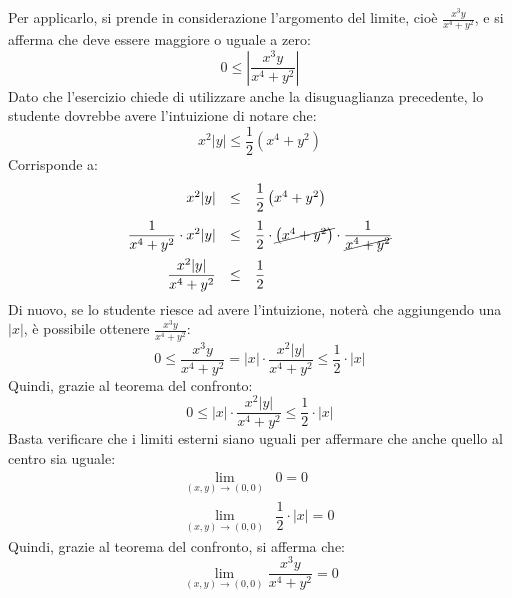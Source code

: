 \documentclass[a4paper]{article}
\begin{document}
	\noindent
	Per applicarlo, si prende in considerazione l'argomento del limite, cioè $\frac{x^{3}y}{x^{4}+y^{2}}$, e si afferma che deve essere maggiore o uguale a zero:
	\begin{equation*}
		0 \le \left| \dfrac{x^{3}y}{x^{4}+y^{2}} \right|
	\end{equation*}
	Dato che l'esercizio chiede di utilizzare anche la disuguaglianza precedente, lo studente dovrebbe avere l'intuizione di notare che:
	\begin{equation*}
		x^{2} |y| \le \dfrac{1}{2}\left(x^{4} + y^{2}\right)
	\end{equation*}
	Corrisponde a:
	\begin{equation*}
		\begin{array}{rcl}
			x^{2} |y| &\le& \dfrac{1}{2}\left(x^{4} + y^{2}\right) \\ [1em]
			\dfrac{1}{x^{4} + y^{2}} \cdot x^{2} |y| &\le& \dfrac{1}{2} \cdot \cancel{\left(x^{4} + y^{2}\right)} \cdot \dfrac{1}{\cancel{x^{4} + y^{2}}} \\ [1em]
			\dfrac{x^{2} |y|}{x^{4} + y^{2}} &\le& \dfrac{1}{2}
		\end{array}
	\end{equation*}
	Di nuovo, se lo studente riesce ad avere l'intuizione, noterà che aggiungendo una $|x|$, è possibile ottenere $\frac{x^{3}y}{x^{4}+y^{2}}$:
	\begin{equation*}
		0 \le \dfrac{x^{3}y}{x^{4}+y^{2}} = |x| \cdot \dfrac{x^{2} |y|}{x^{4} + y^{2}} \le \dfrac{1}{2} \cdot |x|
	\end{equation*}
	Quindi, grazie al teorema del confronto:
	\begin{equation*}
		0 \le |x| \cdot \dfrac{x^{2} |y|}{x^{4} + y^{2}} \le \dfrac{1}{2} \cdot |x|
	\end{equation*}
	Basta verificare che i limiti esterni siano uguali per affermare che anche quello al centro sia uguale:
	\begin{equation*}
		\begin{array}{ll}
			\displaystyle\lim_{\left(x,y\right) \rightarrow \left(0,0\right)} & 0 = 0 \\ [1em]
			\displaystyle\lim_{\left(x,y\right) \rightarrow \left(0,0\right)} & \dfrac{1}{2} \cdot |x| = 0
		\end{array}
	\end{equation*}
	Quindi, grazie al teorema del confronto, si afferma che:
	\begin{equation*}
		\displaystyle\lim_{\left(x,y\right) \rightarrow \left(0,0\right)} \dfrac{x^{3} y}{x^{4} + y^{2}} = 0
	\end{equation*}\newpage
\end{document}
